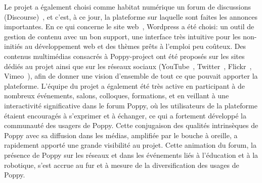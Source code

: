         Le projet a également choisi comme habitat numérique un forum de discussions (Discourse)~, et c'est, à ce jour, la plateforme sur laquelle sont faites les annonces importantes. En ce qui concerne le site web~, Wordpress a été choisi: un outil de gestion de contenu avec un bon support, une interface très intuitive pour les non-initiés au développement web et des thèmes prêts à l'emploi peu coûteux.
        Des contenus multimédias consacrés à Poppy-project ont été proposés sur les sites dédiés au projet ainsi que sur les réseaux sociaux (YouTube~, Twitter~, Flickr~, Vimeo~), afin de donner une vision d'ensemble de tout ce que pouvait apporter la plateforme. L’équipe du projet a également été très active en participant à de nombreux événements, salons, colloques, formations, et en veillant à une interactivité significative dans le forum Poppy, où les utilisateurs de la plateforme étaient encouragés à s’exprimer et à échanger, ce qui a fortement développé la communauté des usagers de Poppy. Cette conjugaison des qualités intrinsèques de Poppy avec sa diffusion dans les médias, amplifiée par le bouche à oreille, a rapidement apporté une grande visibilité au projet.
        Cette animation du forum, la présence de Poppy sur les réseaux et dans les événements liés à l’éducation et à la robotique, s’est accrue au fur et à mesure de la diversification des usages de Poppy.
